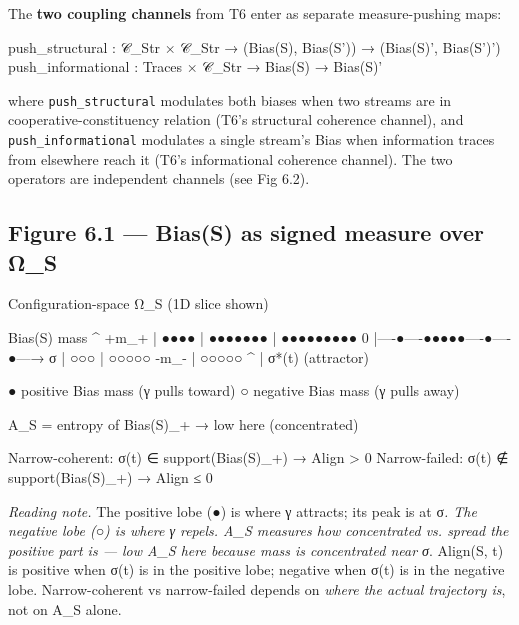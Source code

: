 \documentclass[11pt, openany]{book}
\begin{document}
The \textbf{two coupling channels} from T6 enter as separate measure-pushing maps:

\begin{Code}
push_structural : 𝒞_Str × 𝒞_Str → (Bias(S), Bias(S')) → (Bias(S)', Bias(S')')
push_informational : Traces × 𝒞_Str → Bias(S) → Bias(S)'
\end{Code}

where \texttt{push\_structural} modulates both biases when two streams are in cooperative-constituency relation (T6's structural coherence channel), and \texttt{push\_informational} modulates a single stream's Bias when information traces from elsewhere reach it (T6's informational coherence channel). The two operators are independent channels (see Fig 6.2).

\subsection{Figure 6.1 --- Bias(S) as signed measure over Ω\_\allowbreak{}S}

\begin{Code}
Configuration-space Ω_S (1D slice shown)

Bias(S) mass ^
        +m_+ | ●●●●
             | ●●●●●●●
             | ●●●●●●●●●
           0 |----●----●●●●●----●----●---→ σ
             |             ○○○
             |           ○○○○○
        -m_- |           ○○○○○
                          ^
                          |
                        σ*(t) (attractor)

  ● positive Bias mass (γ pulls toward)
  ○ negative Bias mass (γ pulls away)

  A_S = entropy of Bias(S)_+  → low here (concentrated)

  Narrow-coherent:      σ(t) ∈ support(Bias(S)_+)  → Align > 0
  Narrow-failed:        σ(t) ∉ support(Bias(S)_+)  → Align ≤ 0
\end{Code}

\textit{Reading note.} The positive lobe (●) is where γ attracts; its peak is at σ\textit{. The negative lobe (○) is where γ repels. A\_\allowbreak{}S measures how concentrated vs. spread the positive part is --- low A\_\allowbreak{}S here because mass is concentrated near σ}. Align(S, t) is positive when σ(t) is in the positive lobe; negative when σ(t) is in the negative lobe. Narrow-coherent vs narrow-failed depends on \textit{where the actual trajectory is}, not on A\_\allowbreak{}S alone.
\end{document}
